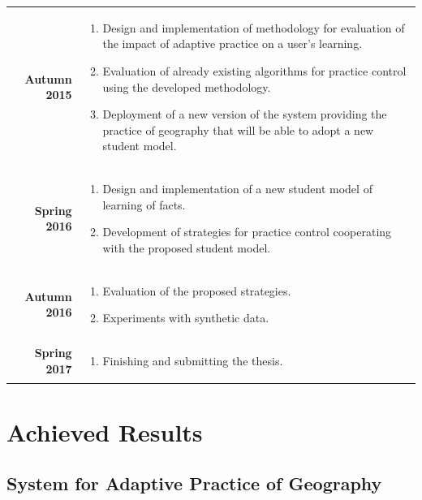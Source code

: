 \documentclass[table,color,cover,twoside,nolot,nolof]{fithesis3/fithesis3}
\begin{document}
\begin{tabularx}{\textwidth}{rX}
	\rowcolor{white}
	\textbf{Autumn 2015} &
		\vspace{-0.75cm}
		\begin{enumerate}
			\item Design and implementation of methodology for evaluation of the impact
				of adaptive practice on a user's learning.
			\item Evaluation of already existing algorithms for practice control using the
				developed methodology.
			\item Deployment of a new version of the system providing the practice of
				geography that will be able to adopt a new student model.
		\end{enumerate}\\
	\rowcolor{white}
	\textbf{Spring 2016} &
		\vspace{-0.75cm}
		\begin{enumerate}
			\item Design and implementation of a new student model of learning of
				facts.
			\item Development of strategies for practice control cooperating with the
				proposed student model.
		\end{enumerate}\\
	\rowcolor{white}
	\textbf{Autumn 2016} &
		\vspace{-0.75cm}
		\begin{enumerate}
			\item Evaluation of the proposed strategies.
			\item Experiments with synthetic data.
		\end{enumerate}\\
	\rowcolor{white}
	\textbf{Spring 2017} &
		\vspace{-0.75cm}
		\begin{enumerate}
			\item Finishing and submitting the thesis.
		\end{enumerate}
\end{tabularx}

\chapter{Achieved Results}
\label{chapter:achieved_results}

\section{System for Adaptive Practice of Geography}
\end{document}
